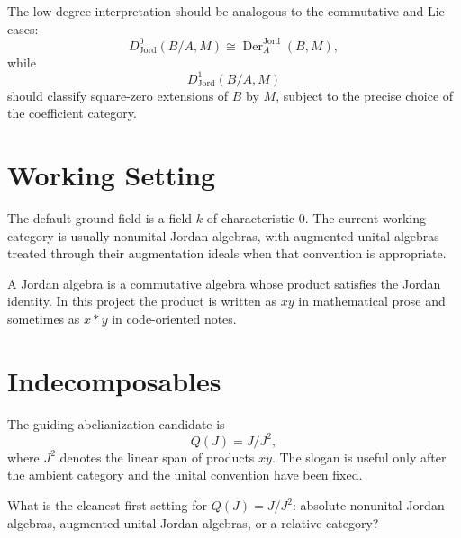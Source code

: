 \begin{note}
  The low-degree interpretation should be analogous to the commutative and Lie
  cases:
  \[
      D^0_{\operatorname{Jord}}(B/A,M)
      \cong
      \operatorname{Der}_A^{\operatorname{Jord}}(B,M),
  \]
  while
  \[
      D^1_{\operatorname{Jord}}(B/A,M)
  \]
  should classify square-zero extensions of \(B\) by \(M\), subject to the precise
  choice of the coefficient category.
\end{note}

\section{Working Setting}

The default ground field is a field \(k\) of characteristic \(0\). The current
working category is usually nonunital Jordan algebras, with augmented unital
algebras treated through their augmentation ideals when that convention is
appropriate.

\begin{definition}
A Jordan algebra is a commutative algebra whose product satisfies the Jordan
identity. In this project the product is written as \(xy\) in mathematical
prose and sometimes as \(x * y\) in code-oriented notes.
\end{definition}

\section{Indecomposables}

The guiding abelianization candidate is
\[
  Q(J) = J/J^2,
\]
where \(J^2\) denotes the linear span of products \(xy\). The slogan is useful
only after the ambient category and the unital convention have been fixed.

\begin{question}
What is the cleanest first setting for \(Q(J)=J/J^2\): absolute nonunital
Jordan algebras, augmented unital Jordan algebras, or a relative category?
\end{question}

